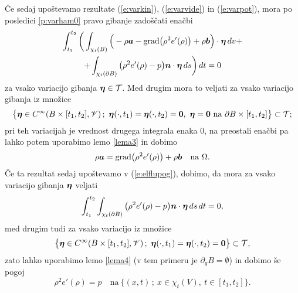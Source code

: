Če sedaj upoštevamo rezultate (\ref{e:varkin}), (\ref{e:varvide}) in (\ref{e:varpot}),
mora po posledici \ref{p:varham0} pravo gibanje zadoščati enačbi
\begin{multline} \label{e:elflupog}
	\int_{t_1}^{t_2}\bigg( \int_{\chi_t(B)}\Big(-\rho\boldsymbol a-
	\mathrm{grad}\big(\rho^2 e'(\rho)\big)+\rho\boldsymbol b\Big)\cdot\boldsymbol \eta\,dv+ \\
	+\int_{\chi_t(\partial B)}\big(\rho^2 e'(\rho)-p\big)\boldsymbol n\cdot\boldsymbol \eta\,ds\bigg)\,dt=0
\end{multline}
za vsako variacijo gibanja $\boldsymbol \eta\in\mathcal{T}$. Med drugim mora to veljati za
vsako variacijo gibanja iz množice
\[
	\big\{ \vek{\eta}\in C^{\infty}(B\times[t_1,t_2],\V)\,;\ \vek{\eta}(\cdot,t_1)=
	\vek{\eta}(\cdot,t_2)=\vek{0},\ \vek{\eta}=\vek{0}\ \textrm{na}\ \partial B\times[t_1,t_2]
	\big\}\subset\mathcal{T};
\]
pri teh variacijah je vrednost drugega integrala enaka 0, na preostali enačbi
pa lahko potem uporabimo lemo \ref{lema3} in dobimo
\begin{equation*}
	\rho\boldsymbol a=\mathrm{grad}\big(\rho^2 e'(\rho)\big)+\rho\boldsymbol b\quad
	\textrm{na}\ \Omega.
\end{equation*}
Če ta rezultat sedaj upoštevamo v (\ref{e:elflupog}), dobimo, da mora
za vsako variacijo gibanja $\boldsymbol \eta$ veljati
\[
	\int_{t_1}^{t_2}\int_{\chi_t(\partial B)}\big(\rho^2 e'(\rho)-p\big)\boldsymbol n\cdot\boldsymbol \eta\,ds\,dt=0,
\]
med drugim tudi za vsako variacijo iz množice
\[
	\big\{ \boldsymbol \eta\in C^{\infty}(B\times[t_1,t_2],\mathscr V)\,;\ \boldsymbol \eta(\cdot,t_1)=
	\boldsymbol \eta(\cdot,t_2)=\boldsymbol 0 \big\}\subset\mathcal{T},
\]
zato lahko uporabimo lemo \ref{lema4} (v tem primeru je $\partial_gB=\emptyset$) in dobimo še pogoj
\[
	\rho^2 e'(\rho)=p \quad\textrm{na}\ \{ (x,t)\,;\ x\in\chi_t(V),\ t\in[t_1,t_2] \}.
\]